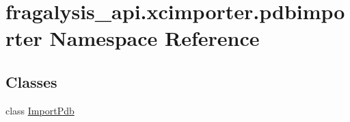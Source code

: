 \hypertarget{namespacefragalysis__api_1_1xcimporter_1_1pdbimporter}{}\section{fragalysis\+\_\+api.\+xcimporter.\+pdbimporter Namespace Reference}
\label{namespacefragalysis__api_1_1xcimporter_1_1pdbimporter}
\subsection*{Classes}
\begin{DoxyCompactItemize}
\item 
class \hyperlink{classfragalysis__api_1_1xcimporter_1_1pdbimporter_1_1_import_pdb}{Import\+Pdb}
\end{DoxyCompactItemize}
